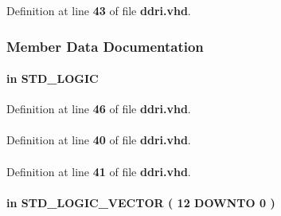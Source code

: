 Definition at line {\bf 43} of file {\bf ddri.\+vhd}.



\subsubsection{Member Data Documentation}
\paragraph[{aclr}]{ {\bfseries \textcolor{keywordflow}{in}\textcolor{vhdlchar}{ }} {\bfseries \textcolor{comment}{S\+T\+D\+\_\+\+L\+O\+G\+IC}\textcolor{vhdlchar}{ }} \hspace{0.3cm}{\ttfamily [Port]}}\label{classddri_a8bc90b7127d506c19a0fd39262a96581}


Definition at line {\bf 46} of file {\bf ddri.\+vhd}.

\paragraph[{altera\+\_\+mf}]{\hspace{0.3cm}{\ttfamily [Library]}}\label{classddri_ad57cd8d31a38ff87ac163fb47757ffbf}


Definition at line {\bf 40} of file {\bf ddri.\+vhd}.

\paragraph[{altera\+\_\+mf\+\_\+components}]{\hspace{0.3cm}{\ttfamily [Package]}}\label{classddri_a421d8a97945a4307e385df667430facb}


Definition at line {\bf 41} of file {\bf ddri.\+vhd}.

\paragraph[{datain}]{ {\bfseries \textcolor{keywordflow}{in}\textcolor{vhdlchar}{ }} {\bfseries \textcolor{comment}{S\+T\+D\+\_\+\+L\+O\+G\+I\+C\+\_\+\+V\+E\+C\+T\+OR}\textcolor{vhdlchar}{ }\textcolor{vhdlchar}{(}\textcolor{vhdlchar}{ }\textcolor{vhdlchar}{ } \textcolor{vhdldigit}{12} \textcolor{vhdlchar}{ }\textcolor{keywordflow}{D\+O\+W\+N\+TO}\textcolor{vhdlchar}{ }\textcolor{vhdlchar}{ } \textcolor{vhdldigit}{0} \textcolor{vhdlchar}{ }\textcolor{vhdlchar}{)}\textcolor{vhdlchar}{ }} \hspace{0.3cm}{\ttfamily [Port]}}\label{classddri_ab24564d1aab39b48f4e0b7adc5883f80}


